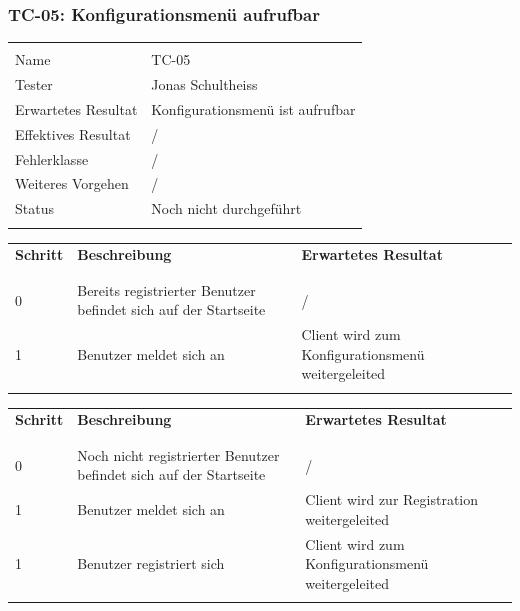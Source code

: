 \subsubsection{TC-05: Konfigurationsmenü aufrufbar}
\begin{table}[H]
  \begin{tabularx}{\textwidth}{l X}\hline \\
  Name & TC-05 \\
  Tester & Jonas Schultheiss \\
  Erwartetes Resultat & Konfigurationsmenü ist aufrufbar \\
  Effektives Resultat & / \\
  Fehlerklasse & / \\
  Weiteres Vorgehen & / \\
  Status & Noch nicht durchgeführt \\
  \\\hline
  \end{tabularx}
\end{table}
\begin{table}[H]
  \begin{tabularx}{\textwidth}{l X X}
  \textbf{Schritt} & \textbf{Beschreibung} & \textbf{Erwartetes Resultat}\\ \\\hline \\
  0 & Bereits registrierter Benutzer befindet sich auf der Startseite  & / \\
  1 & Benutzer meldet sich an & Client wird zum Konfigurationsmenü weitergeleited \\
  \\\hline
  \end{tabularx}
\end{table}
\begin{table}[H]
  \begin{tabularx}{\textwidth}{l X X}
  \textbf{Schritt} & \textbf{Beschreibung} & \textbf{Erwartetes Resultat}\\ \\\hline \\
  0 & Noch nicht registrierter Benutzer befindet sich auf der Startseite  & / \\
  1 & Benutzer meldet sich an & Client wird zur Registration weitergeleited \\
  1 & Benutzer registriert sich & Client wird zum Konfigurationsmenü weitergeleited \\
  \\\hline
  \end{tabularx}
\end{table}
\pagebreak
